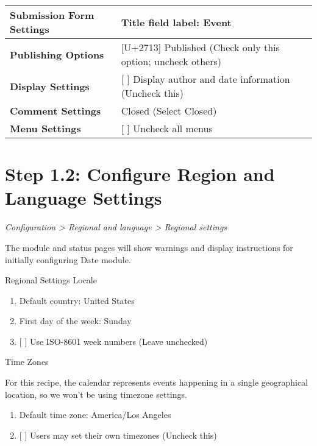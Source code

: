 \documentclass[letterpaper,10pt,english]{sphinxmanual}
\begin{document}
\begin{tabulary}{\linewidth}{|L|L|}
\hline

\textbf{Submission Form Settings}
 & 
Title field label: Event
\\\hline

\textbf{Publishing Options}
 & 
{[}U+2713{]} Published (Check only this option; uncheck others)
\\\hline

\textbf{Display Settings}
 & 
{[}  {]} Display author and date information (Uncheck this)
\\\hline

\textbf{Comment Settings}
 & 
Closed (Select Closed)
\\\hline

\textbf{Menu Settings}
 & 
{[}  {]} Uncheck all menus
\\\hline
\end{tabulary}



\section{Step 1.2: Configure Region and Language Settings}
\label{event_calendar:step-1-2-configure-region-and-language-settings}
\emph{Configuration \textgreater{} Regional and language \textgreater{} Regional settings}

The module and status pages will show warnings and display instructions for initially configuring Date module.

Regional Settings
Locale
\begin{enumerate}
\item {} 
Default country: United States

\item {} 
First day of the week: Sunday

\item {} 
{[} {]} Use ISO-8601 week numbers  (Leave unchecked)

\end{enumerate}

Time Zones

For this recipe, the calendar represents events happening in a single geographical location, so we won't be using timezone settings.
\begin{enumerate}
\item {} 
Default time zone: America/Los Angeles

\item {} 
{[} {]} Users may set their own timezones (Uncheck this)

\end{enumerate}
\end{document}
